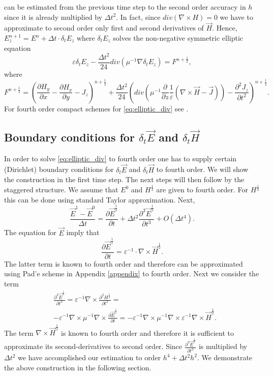 \documentclass[12pt,reqno]{amsart}
\theoremstyle{definition}
\numberwithin{equation}{section}
\begin{document}
			can be estimated from the previous
			time  step to the second order  accuracy in $h$ since it is already multiplied by $\Delta t ^2$. 
			In fact, since $div(\nabla\times H)=0$ we have to approximate to second order only first and second derivatives  of $\vec{H}$.
			Hence,
			$E_z^{n+1}=E^n+\Delta t\cdot \delta_t E_z$ where 
			$\delta_t E_z$ solves the non-negative symmetric  elliptic equation
			\begin{equation}\label{eq:elliptic_div}
				\varepsilon \delta_t E_z-\frac{\Delta t^2}{24}div(\mu^{-1}\nabla \delta_t E_z)=F^{n+\frac{1}{2}},
			\end{equation}
			where 
			$$
			F^{n+\frac{1}{2}}=
			\left ( \frac{\partial H_y}{\partial x}-
			\frac{\partial H_x}{\partial y}-J_z
			\right)^{n+\frac{1}{2}}+\frac{\Delta t^2}{24}\left (
			div\left(
			\mu^{-1}\frac{\partial }{ \partial z}\frac{1}{\varepsilon}(
			\nabla \times \vec{H} -\vec{J}
			)
			\right )-\frac{\partial^2J_z}{\partial t^2}
			\right)^{n+\frac{1}{2}}.
			$$
			For fourth order compact schemes for \eqref{eq:elliptic_div} see \cite{britt_tsy_tur}. 
				\subsection{Boundary conditions for $\delta_t \vec{E}$ and  $\delta_t \vec{H}$}
			In order to solve \eqref{eq:elliptic_div} to fourth order  one has to supply certain (Dirichlet) boundary conditions for $\delta_t \vec{E}$ and  $\delta_t \vec{H}$ to fourth order.
			We will show the construction in the first  time step. The next steps  will then follow by the staggered structure.
			We assume that $E^0$ and $H^{\frac{1}{2}}$ are given to fourth order.
			For $H^{\frac{1}{2}}$ this can be done using  standard Taylor approximation.
			Next,
			$$
			\frac{\vec{E}^{1}-\vec{E}^{0}}{\Delta t}=\frac{\partial \vec{E}^{\frac{1}{2}}}{\partial t}+
			\Delta t^2\frac{\partial^3 \vec{E}^{\frac{1}{2}}}{\partial t^3}+O(\Delta t^4).
			$$
			The equation for $\vec{E}$ imply that 
			$$
			\frac{\partial \vec{E}^{\frac{1}{2}}}{\partial t}=\varepsilon^{-1}\cdot \nabla \times \vec{H}^{\frac{1}{2}}.
			$$
			The latter term is known to fourth order  and therefore can be approximated using Pad'e scheme in Appendix \ref{appendix} to fourth order. 
			Next we consider the term 
			\begin{align*}
				&
				\frac{\partial^3 \vec{E}^{\frac{1}{2}}}{\partial t^3} =
				\varepsilon^{-1}\nabla \times  \frac{\partial^2 H^{\frac{1}{2}}}{\partial t^2}=
				\\&
				-\varepsilon^{-1}\nabla\times \mu^{-1}
				\nabla \times \frac{\partial \vec{E}^{\frac{1}{2}}}{\partial t}=
				-\varepsilon^{-1}\nabla\times \mu^{-1} \nabla \times
				\varepsilon^{-1}\nabla\times \vec{H}^{\frac{1}{2}}.
			\end{align*}
			The term $ \nabla\times \vec{H}^{\frac{1}{2}}$ is known to fourth order and therefore it is sufficient to approximate its  second-derivatives to second order. Since 
			$\frac{\partial^3 \vec{E}^{\frac{1}{2}}}{\partial t^3}$ is multiplied by $\Delta t^2$ we have accomplished our estimation to order $h^4+\Delta t^2h^2$.
			We demonstrate the above construction   in the following section.
			
\end{document}
